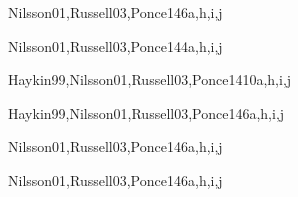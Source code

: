\begin{syllabus}
\begin{unit}{\ISAgentsDef}{Nilsson01,Russell03,Ponce14}{6}{a,h,i,j}
    \ISAgentsAllTopics
    \ISAgentsAllObjectives
\end{unit}

\begin{unit}{\ISNaturalLanguageProcessingDef}{Nilsson01,Russell03,Ponce14}{4}{a,h,i,j}
    \ISNaturalLanguageProcessingAllTopics
    \ISNaturalLanguageProcessingAllObjectives
\end{unit}

\begin{unit}{\ISMachineLearningDef}{Haykin99,Nilsson01,Russell03,Ponce14}{10}{a,h,i,j}
    \ISMachineLearningAllTopics
    \ISMachineLearningAllObjectives
\end{unit}

\begin{unit}{\ISPlanningSystemsDef}{Haykin99,Nilsson01,Russell03,Ponce14}{6}{a,h,i,j}
    \ISPlanningSystemsAllTopics
    \ISPlanningSystemsAllObjectives
\end{unit}

\begin{unit}{\ISRoboticsDef}{Nilsson01,Russell03,Ponce14}{6}{a,h,i,j}
    \ISRoboticsAllTopics
    \ISRoboticsAllObjectives
\end{unit}

\begin{unit}{\ISPerceptionDef}{Nilsson01,Russell03,Ponce14}{6}{a,h,i,j}
    \ISPerceptionAllTopics
    \ISPerceptionAllObjectives
\end{unit}



\begin{coursebibliography}
\end{coursebibliography}

\end{syllabus}
